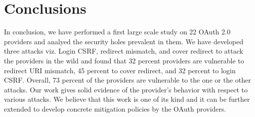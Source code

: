 \section{Conclusions}
\label{sec:conclusions}
In conclusion, we have performed a first large scale study on 22 OAuth 2.0 providers and analyed the security holes prevalent in them. We have developed three attacks viz. Login CSRF, redirect mismatch, and cover redirect to attack the providers in the wild and found that 32 percent providers are vulnerable to redirect URI mismatch, 45 percent to cover redirect, and 32 percent to login CSRF. Overall, 73 percent of the providers are vulnerable to the one or the other attacks. Our work gives solid evidence of the provider's behavior with respect to various attacks. We believe that this work is one of its kind and it can be further extended to develop concrete mitigation policies by the OAuth providers.
